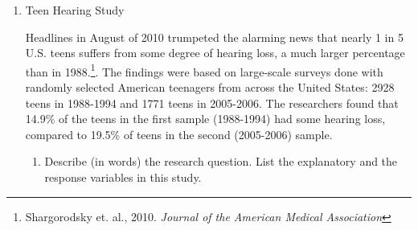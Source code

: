 \begin{enumerate}
\begin{enumerate}
\item Suppose that all counts were divided by 5, so we had 1 allergy
  in the treatment group and 7 in the controls (out of 49 and 51
  kids).  Explain how your p-value would have been different in this
  case.  Also describe how the strength of evidence for the benefit of
  peanut protein would have changed.  
\begin{students}
  \vspace{6in}
\end{students}

\begin{key}
   {\it A good guess is that the same proportion in the smaller study
     provides weaker evidence. It does.  When I run 5000 trials with
     100 kids, the differences I got 16 values $< -0.117$ for a
     p-value of  $< .003$.}
\end{key}
  \end{enumerate}



  \begin{center}
  {\bf  More Examples}
  \end{center}

The following exercises are adapted from the CATALST curriculum at
\url{https://github.com/zief0002/Statistical-Thinking}. 


\item Teen Hearing Study

  Headlines in August of 2010 trumpeted the alarming news that nearly
  1 in 5 U.S. teens suffers from some degree of hearing loss, a much
  larger percentage than in 1988.\footnote{ Shargorodsky et. al.,
    2010. {\it Journal of the American Medical Association}}.  The
  findings were based on large-scale surveys done with randomly
  selected American teenagers from across the United States: 2928
  teens in 1988-1994 and 1771 teens in 2005-2006.  The researchers
  found that 14.9\% of the teens in the first sample (1988-1994) had
  some hearing loss, compared to 19.5\% of teens in the second
  (2005-2006) sample.
\begin{enumerate}
\item  Describe (in words) the research question. List the explanatory and
  the response variables in this study.   
 \begin{students}
  \vspace{2cm}
\end{students}


\end{enumerate}
\end{enumerate}
